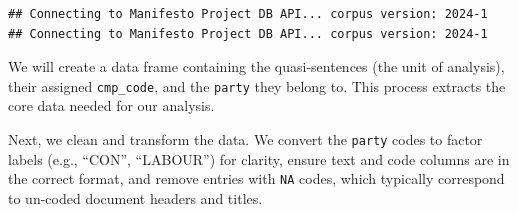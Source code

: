 \documentclass[
]{book}
\newenvironment{Shaded}{\begin{snugshade}}{\end{snugshade}}
\newcommand{\AttributeTok}[1]{\textcolor[rgb]{0.13,0.29,0.53}{#1}}
\newcommand{\CommentTok}[1]{\textcolor[rgb]{0.56,0.35,0.01}{\textit{#1}}}
\newcommand{\ConstantTok}[1]{\textcolor[rgb]{0.56,0.35,0.01}{#1}}
\newcommand{\ControlFlowTok}[1]{\textcolor[rgb]{0.13,0.29,0.53}{\textbf{#1}}}
\newcommand{\FunctionTok}[1]{\textcolor[rgb]{0.13,0.29,0.53}{\textbf{#1}}}
\newcommand{\NormalTok}[1]{#1}
\newcommand{\OtherTok}[1]{\textcolor[rgb]{0.56,0.35,0.01}{#1}}
\newcommand{\SpecialCharTok}[1]{\textcolor[rgb]{0.81,0.36,0.00}{\textbf{#1}}}
\begin{document}
\begin{verbatim}
## Connecting to Manifesto Project DB API... corpus version: 2024-1 
## Connecting to Manifesto Project DB API... corpus version: 2024-1
\end{verbatim}

We will create a data frame containing the quasi-sentences (the unit of analysis), their assigned \texttt{cmp\_code}, and the \texttt{party} they belong to. This process extracts the core data needed for our analysis.

\begin{Shaded}
\end{Shaded}

Next, we clean and transform the data. We convert the \texttt{party} codes to factor labels (e.g., ``CON'', ``LABOUR'') for clarity, ensure text and code columns are in the correct format, and remove entries with \texttt{NA} codes, which typically correspond to un-coded document headers and titles.
\end{document}
